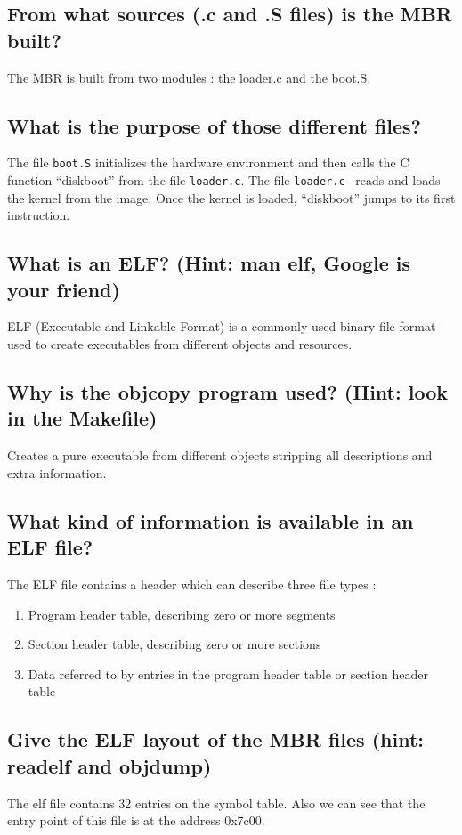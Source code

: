 \documentclass[10]{article}
\begin{document}
\subsection{From what sources (.c and .S files) is the MBR built?}
	The MBR is built from two modules : the loader.c and the  boot.S.

\subsection{What is the purpose of those different files?}
	The file \texttt{boot.S} initializes the hardware environment and then calls the C function “diskboot” from the file \texttt{loader.c}.
	The file \texttt{loader.c } reads and loads the kernel from the image. Once the kernel is loaded, “diskboot” jumps to its first instruction.
\subsection{What is an ELF? (Hint: man elf, Google is your friend)}
	ELF (Executable and Linkable Format) is a commonly-used binary file format used to create executables from different objects and resources.
\subsection{Why is the objcopy program used? (Hint: look in the Makefile)}
	Creates a pure executable from different objects stripping all descriptions and extra information.

\subsection{What kind of information is available in an ELF file?}
The ELF file contains a header which can describe three file types :
\begin{enumerate}
	 \item
	Program header table, describing zero or more segments
	\item
	Section header table, describing zero or more sections
	\item
	Data referred to by entries in the program header table or section header table
\end{enumerate}
\subsection{Give the ELF layout of the MBR files (hint: readelf and objdump)}
The elf file contains 32 entries on the symbol table. Also we can see that the entry point of this file is at the address 0x7c00.
\end{document}
